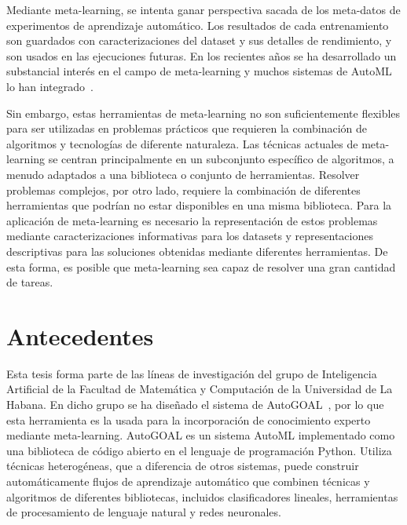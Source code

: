 
Mediante meta-learning, se intenta ganar perspectiva sacada de los meta-datos de experimentos de aprendizaje automático. Los resultados de cada entrenamiento son guardados con caracterizaciones del dataset y sus detalles de rendimiento, y son usados en las ejecuciones futuras. En los recientes años se ha desarrollado un substancial interés en el campo de meta-learning y muchos sistemas de AutoML lo han integrado~\cite{fuerer2015efficient, maher2019smartml, drori2018alphad3m, yang2018oboe, zimmer2021auto, Feurer2020AutoSklearn2T}.

Sin embargo, estas herramientas de meta-learning no son suficientemente flexibles para ser utilizadas en problemas prácticos que requieren la combinación de algoritmos y tecnologías de diferente naturaleza. Las técnicas actuales de meta-learning se centran principalmente en un subconjunto específico de algoritmos, a menudo adaptados a una biblioteca o conjunto de herramientas. Resolver problemas complejos, por otro lado, requiere la combinación de diferentes herramientas que podrían no estar disponibles en una misma biblioteca. Para la aplicación de meta-learning es necesario la representación de estos problemas mediante caracterizaciones informativas para los datasets y representaciones descriptivas para las soluciones obtenidas mediante diferentes herramientas. De esta forma, es posible que meta-learning sea capaz de resolver una gran cantidad de tareas.

\section*{Antecedentes}

Esta tesis forma parte de las líneas de investigación del grupo de Inteligencia Artificial de la Facultad de Matemática y Computación de la Universidad de La Habana. En dicho grupo se ha diseñado el sistema de AutoGOAL~\cite{autogoal},  por lo que esta herramienta es la usada para la incorporación de conocimiento experto mediante meta-learning. AutoGOAL es un sistema AutoML implementado como una biblioteca de código abierto en el lenguaje de programación Python. Utiliza técnicas heterogéneas, que a diferencia de otros sistemas, puede construir automáticamente flujos de aprendizaje automático que combinen técnicas y algoritmos de diferentes bibliotecas, incluidos clasificadores lineales, herramientas de procesamiento de lenguaje natural y redes neuronales.

